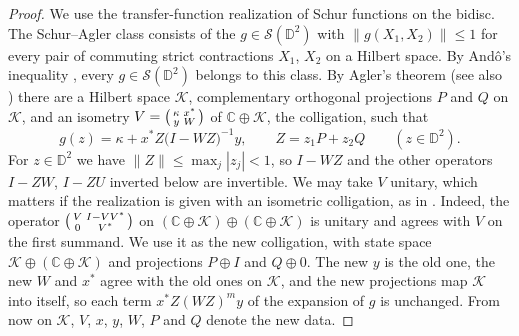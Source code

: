 \documentclass[11pt]{amsart}
\theoremstyle{remark}
\numberwithin{equation}{section}
\newcommand{\C}{\mathbb{C}}
\newcommand{\D}{\mathbb{D}}
\begin{document}
\begin{proof}
We use the transfer-function realization of Schur functions on the bidisc. The Schur--Agler class consists of the $g\in\mathcal S(\D^2)$ with $\|g(X_1,X_2)\|\le1$ for every pair of commuting strict contractions $X_1$, $X_2$ on a Hilbert space. By And\^o's inequality \cite{And63}, every $g\in\mathcal S(\D^2)$ belongs to this class. By Agler's theorem \cite{Agl90} (see also \cite{BT98,AM02}) there are a Hilbert space $\mathcal K$, complementary orthogonal projections $P$ and $Q$ on $\mathcal K$, and an isometry $V=\begin{psmallmatrix}\kappa&x^*\\y&W\end{psmallmatrix}$ of $\C\oplus\mathcal K$, the colligation, such that
\[
g(z)=\kappa+x^*Z\bigl(I-WZ\bigr)^{-1}y,\qquad Z=z_1P+z_2Q\qquad(z\in\D^2).
\]
For $z\in\D^2$ we have $\|Z\|\le\max_j|z_j|<1$, so $I-WZ$ and the other operators $I-ZW$, $I-ZU$ inverted below are invertible.
We may take $V$ unitary, which matters if the realization is given with an isometric colligation, as in \cite[Section~2]{Kne25}. Indeed, the operator $\begin{psmallmatrix}V&I-VV^*\\0&V^*\end{psmallmatrix}$ on $(\C\oplus\mathcal K)\oplus(\C\oplus\mathcal K)$ is unitary and agrees with $V$ on the first summand. We use it as the new colligation, with state space $\mathcal K\oplus(\C\oplus\mathcal K)$ and projections $P\oplus I$ and $Q\oplus0$. The new $y$ is the old one, the new $W$ and $x^*$ agree with the old ones on $\mathcal K$, and the new projections map $\mathcal K$ into itself, so each term $x^*Z(WZ)^my$ of the expansion of $g$ is unchanged. From now on $\mathcal K$, $V$, $x$, $y$, $W$, $P$ and $Q$ denote the new data.


\end{proof}
\end{document}
